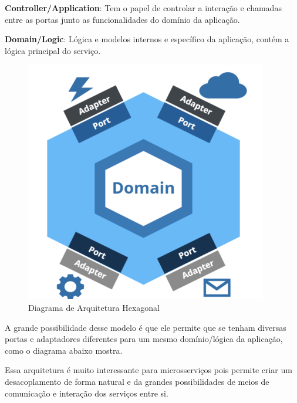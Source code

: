     	\textbf{Controller/Application}: Tem o papel de controlar a interação e chamadas entre as portas junto as funcionalidades do domínio da aplicação.
    	
    	\textbf{Domain/Logic}: Lógica e modelos internos e específico da aplicação, contém a lógica principal do serviço.
    	
    	\begin{figure}[htpb]
    	    \caption{Diagrama de Arquitetura Hexagonal}
    	    \begin{center}
    	        \includegraphics[scale=0.6]{pictures/hexagonal1.png}
    	    \end{center}
    	    \label{fig:hexagonal1}
    	\end{figure}
    
    	A grande possibilidade desse modelo é que ele permite que se tenham diversas portas e adaptadores diferentes para um mesmo domínio/lógica da aplicação, como o diagrama abaixo mostra.
    	
    	Essa arquitetura é muito interessante para microsserviços pois permite criar um desacoplamento de forma natural e da grandes possibilidades de meios de comunicação e interação dos serviços entre si.